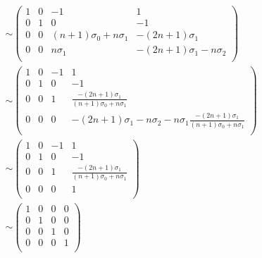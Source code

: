 \begin{displaymath}
    \begin{split}
        &\sim
    \left(
    \begin{array}{cccc}
        1          & 0          & -1                       & 1               \\
        0          & 1          & 0                        & -1              \\
        0          & 0          & (n+1)\sigma_0 +n\sigma_1 & -(2n+1)\sigma_1 \\
        0          & 0          & n\sigma_1                & -(2n+1)\sigma_1 -n\sigma_2 \\
    \end{array}
    \right)
    \\
        &\sim
    \left(
    \begin{array}{cccc}
        1          & 0          & -1                       & 1               \\
        0          & 1          & 0                        & -1              \\
        0          & 0          & 1                        & \frac{-(2n+1)\sigma_1}{(n+1)\sigma_0 +n\sigma_1} \\
        0          & 0          & 0                        & -(2n+1)\sigma_1 -n\sigma_2 - n\sigma_1\frac{-(2n+1)\sigma_1}{(n+1)\sigma_0 +n\sigma_1}  \\
    \end{array}
    \right)
    \\
        &\sim
    \left(
    \begin{array}{cccc}
        1          & 0          & -1                       & 1               \\
        0          & 1          & 0                        & -1              \\
        0          & 0          & 1                        & \frac{-(2n+1)\sigma_1}{(n+1)\sigma_0 +n\sigma_1} \\
        0          & 0          & 0                        & 1  \\
    \end{array}
    \right)
    \\
        &\sim
    \left(
    \begin{array}{cccc}
        1          & 0          & 0                        & 0 \\
        0          & 1          & 0                        & 0 \\
        0          & 0          & 1                        & 0 \\
        0          & 0          & 0                        & 1  \\
    \end{array}
    \right)
    \end{split}
\end{displaymath}
